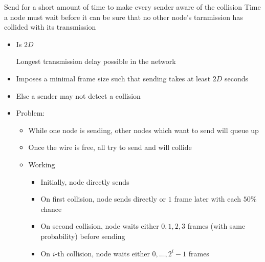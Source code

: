 \begin{itemize}
\begin{itemize}
             Send for a short amount of time to make every sender aware of the collision
             Time a node must wait before it can be sure that no other node's tarnmission has collided with its transmission
                \begin{itemize}
                    \item Is $2D$
                        \begin{itemize}
                             Longest transmission delay possible in the network
                        \end{itemize}
                    \item Imposes a minimal frame size such that sending takes at least $2D$ seconds
                    \item Else a sender may not detect a collision
                \end{itemize}
            \end{itemize}
        \begin{itemize}
            \item Problem:
                \begin{itemize}
                    \item While one node is sending, other nodes which want to send will queue up
                    \item Once the wire is free, all try to send and will collide
                \end{itemize}
                \begin{itemize}
                     When $N$ nodes are queued, each will send with a probability of $\frac{1}{N}$
                    \item Working
                        \begin{itemize}
                            \item Initially, node directly sends
                            \item On first collision, node sends directly or $1$ frame later with each $50\%$ chance
                            \item On second collision, node waits either $0, 1, 2, 3$ frames (with same probability) before sending
                            \item On $i$-th collision, node waits either $0, \dots, 2^i-1$ frames
                        \end{itemize}

\end{itemize}
\end{itemize}
\end{itemize}
